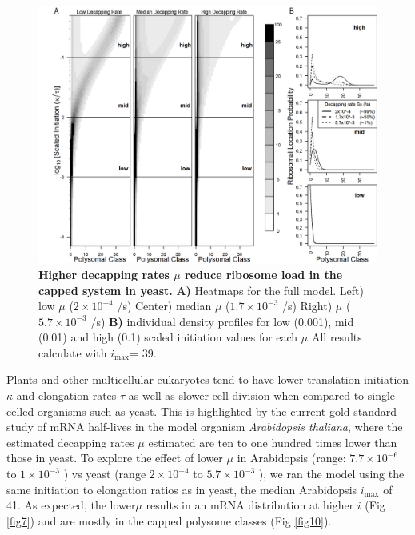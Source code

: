 \documentclass[10pt,letterpaper]{article}
\newcommand{\imax}{\ensuremath{{i_{\max}}}\xspace}
\begin{document}
\begin{figure}[!h]
\begin{center}
\includegraphics[width=140mm]{Images/2023-07-09_Figure2_Marking_Rate_range_medianlength_with_labels.png}
\caption{{\bf Higher decapping rates $\mu$ reduce ribosome load in the capped system in yeast.}  {\bf A)}  Heatmaps for the full model. Left) low $\mu$ ($2\times 10^{-4}$ /s) Center) median $\mu$ ($1.7\times 10^{-3}$ /s) Right) $\mu$ ($5.7\times 10^{-3}$ /s) {\bf  B)} individual density profiles for low (0.001), mid (0.01) and high (0.1) scaled initiation values for each $\mu$ All results calculate with \imax = 39.}
\label{fig6}
\end{center}
\end{figure}


Plants and other multicellular eukaryotes tend to have lower translation initiation $\kappa$ and elongation rates $\tau$ as well as slower cell division when compared to single celled organisms such as yeast.
This is highlighted by the current gold standard study of mRNA half-lives in the model organism \textit{Arabidopsis thaliana}, where the estimated decapping rates $\mu$ estimated are ten to one hundred times lower than those in yeast. 
To explore the effect of lower $\mu$ in Arabidopsis (range: $7.7 \times 10^{-6}$ to $1 \times 10^{-3}$ ) vs yeast (range $2 \times 10^{-4}$ to $5.7 \times 10^{-3}$ ), we ran the model using the same initiation to elongation ratios as in yeast, the median Arabidopsis \imax of 41. 
As expected, the lower$\mu$ results in an mRNA distribution at higher $i$ (Fig \ref{fig7}) and are mostly in the capped polysome classes (Fig \ref{fig10}).
\end{document}
